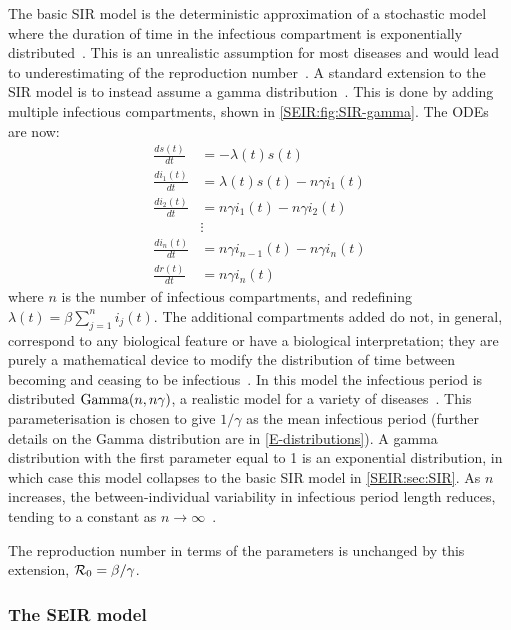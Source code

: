 \documentclass[thesis.tex]{subfiles}
\begin{document}
The basic SIR model is the deterministic approximation of a stochastic model where the duration of time in the infectious compartment is exponentially distributed~\autocite[96]{keelingModeling}.
This is an unrealistic assumption for most diseases and would lead to underestimating of the reproduction number~\autocite{lloydRealistic,wearingAppropriate}.
A standard extension to the SIR model is to instead assume a gamma distribution~\autocite[94]{keelingModeling,andersonSpread}.
This is done by adding multiple infectious compartments, shown in \cref{SEIR:fig:SIR-gamma}.
The ODEs are now:
\begin{align}
\frac{ds(t)}{dt} &= -\lambda(t) s(t)\\
\frac{di_1(t)}{dt} &= \lambda(t) s(t) - n\gamma i_1(t) \\
\frac{di_2(t)}{dt} &= n\gamma i_1(t) - n \gamma i_2(t) \\
&\vdots \nonumber \\
\frac{di_n(t)}{dt} &= n\gamma i_{n-1}(t) - n \gamma i_n(t) \\
\frac{dr(t)}{dt} &= n\gamma i_n(t)
\end{align}
where $n$ is the number of infectious compartments, and redefining $\lambda(t) = \beta \sum_{j=1}^n i_j(t)$.
The additional compartments added do not, in general, correspond to any biological feature or have a biological interpretation; they are purely a mathematical device to modify the distribution of time between becoming and ceasing to be infectious~\autocite{lloydRealistic}.
In this model the infectious period is distributed $\operatorname{Gamma}(n, n\gamma)$, a realistic model for a variety of diseases~\autocite{wearingAppropriate}.
This parameterisation is chosen to give $1/\gamma$ as the mean infectious period (further details on the Gamma distribution are in \cref{E-distributions}).
A gamma distribution with the first parameter equal to 1 is an exponential distribution, in which case this model collapses to the basic SIR model in \cref{SEIR:sec:SIR}.
As $n$ increases, the between-individual variability in infectious period length reduces, tending to a constant as $n \to \infty$~\autocite{lloydRealistic}.

The reproduction number in terms of the parameters is unchanged by this extension, \ie $\mathcal{R}_{0} = \beta / \gamma$.

\subsubsection{The SEIR model} \label{SEIR:sec:SEIR}
\end{document}
